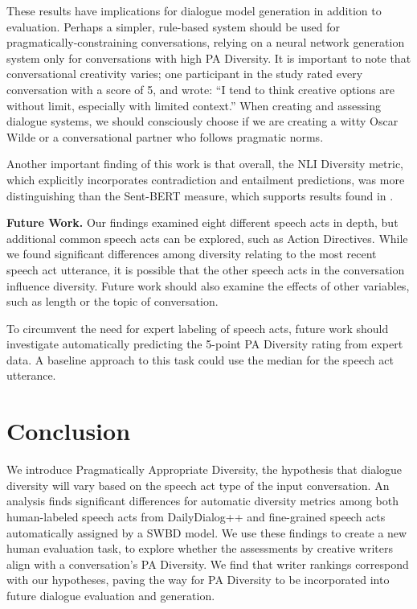 \documentclass[11pt]{article}
\newcommand{\ediv}{Pragmatically Appropriate Diversity}
\newcommand{\edivshort}{PA Diversity}
\newcommand{\edivshortspace}{PA Diversity }
\begin{document}
These results  have implications for  dialogue model generation in addition to evaluation.  Perhaps a simpler, rule-based system should be used for pragmatically-constraining conversations, relying on a neural network generation system only for conversations with high \edivshort.  It is important to note that conversational creativity varies; one participant in the study rated every conversation with a score of 5, and wrote:
``I tend to think creative options are without limit, especially with limited context.''  When creating and assessing dialogue systems, we should consciously choose if we are creating a witty Oscar Wilde or a conversational partner who follows pragmatic norms.

Another important finding of this work is that overall, the NLI Diversity metric, which explicitly incorporates contradiction and entailment predictions, was more distinguishing than the Sent-BERT measure, which 
supports results found in \citet{nli-placeholder}.  

\textbf{Future Work.}  Our  findings examined eight different speech acts in depth, but  additional common speech acts can be explored, such as  Action Directives. 
While we found significant differences among diversity relating to the most recent speech act utterance, it is possible that the other speech acts in the conversation influence diversity. Future work should also  examine the effects of other variables, such as length or the topic of conversation.

To circumvent the need for expert labeling of speech acts, future work should investigate automatically predicting the 5-point \edivshortspace rating from expert data. 
A baseline approach to this task could use the median for the speech act utterance.




\section{Conclusion}\label{sec:conclusion}
We introduce \ediv, the hypothesis that 
dialogue diversity will vary based on the speech act type of the input conversation.  An analysis finds significant differences for automatic diversity metrics among both human-labeled speech acts from DailyDialog++ and fine-grained speech acts automatically assigned by a SWBD model.  We use these findings to create a new human evaluation task, to explore whether the assessments by creative writers align with a conversation's \edivshort.  We find that writer rankings correspond with our hypotheses, paving the way for \edivshortspace 
to be incorporated into future dialogue evaluation and generation. 
\end{document}
